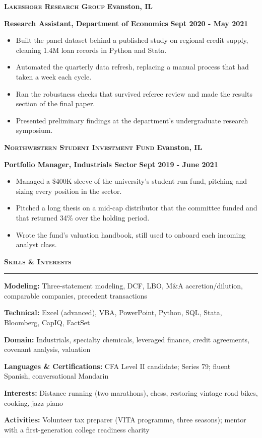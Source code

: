 \documentclass{article}
\newcommand{\vs}{\vspace{0.3cm}}
\begin{document}
\noindent \textbf{\textsc{Lakeshore Research Group}} \hfill \textbf{Evanston, IL}

\noindent \textbf{Research Assistant, Department of Economics} \hfill \textbf{Sept 2020 - May 2021}
\begin{itemize}
	\item Built the panel dataset behind a published study on regional credit supply, cleaning 1.4M loan records in Python and Stata.
	\item Automated the quarterly data refresh, replacing a manual process that had taken a week each cycle.
	\item Ran the robustness checks that survived referee review and made the results section of the final paper.
	\item Presented preliminary findings at the department's undergraduate research symposium.
\end{itemize}

\noindent \textbf{\textsc{Northwestern Student Investment Fund}} \hfill \textbf{Evanston, IL}

\noindent \textbf{Portfolio Manager, Industrials Sector} \hfill \textbf{Sept 2019 - June 2021}
\begin{itemize}
	\item Managed a \$400K sleeve of the university's student-run fund, pitching and sizing every position in the sector.
	\item Pitched a long thesis on a mid-cap distributor that the committee funded and that returned 34\% over the holding period.
	\item Wrote the fund's valuation handbook, still used to onboard each incoming analyst class.
\end{itemize}
\vs

\noindent \textbf{\textsc{\large Skills \& Interests}}

\noindent \rule[3pt]{\textwidth}{1pt}

\noindent \textbf{Modeling:} Three-statement modeling, DCF, LBO, M\&A accretion/dilution, comparable companies, precedent transactions

\noindent \textbf{Technical:} Excel (advanced), VBA, PowerPoint, Python, SQL, Stata, Bloomberg, CapIQ, FactSet

\noindent \textbf{Domain:} Industrials, specialty chemicals, leveraged finance, credit agreements, covenant analysis, valuation

\noindent \textbf{Languages \& Certifications:} CFA Level II candidate; Series 79; fluent Spanish, conversational Mandarin

\noindent \textbf{Interests:} Distance running (two marathons), chess, restoring vintage road bikes, cooking, jazz piano

\noindent \textbf{Activities:} Volunteer tax preparer (VITA programme, three seasons); mentor with a first-generation college readiness charity
\end{document}
